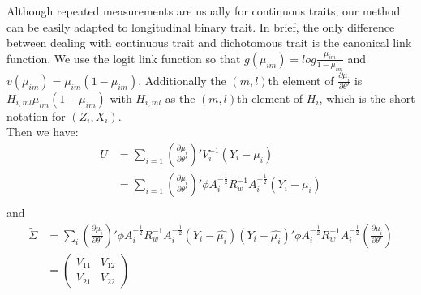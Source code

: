 \documentclass[12pt]{article}
\begin{document}

Although repeated measurements are usually for continuous traits, our method can be easily adapted to longitudinal binary trait. In brief, the only difference between dealing with continuous trait and dichotomous trait is the canonical link function.
We use the logit link function so that $g(\mu_{im}) = log \frac{\mu_{im}}{1 - \mu_{im}}$ and $v(\mu_{im}) = \mu_{im} (1 - \mu_{im})$. Additionally the $(m, l)$th element of $\frac{\partial\mu_{i}}{\partial\theta'}$ is
$
H_{i,ml} \mu_{im} (1- \mu_{im})
$
with $H_{i,ml}$ as the $(m, l)$th element of $H_i$, which is the short notation for $(Z_{i},X_{i})$.\\
Then we have:
\begin{align*}
U & = \sum_{i=1} (\frac{\partial\mu_{i}}{\partial\theta'})' V_i^{-1} (Y_{i}-\mu_{i})\\
& = \sum_{i=1} (\frac{\partial\mu_{i}}{\partial\theta'})' \phi A_{i}^{-\frac{1}{2}} R_{w}^{-1} A_{i}^{-\frac{1}{2}} (Y_{i}-\mu_{i})\\
\end{align*}
and
\begin{align*}
\widetilde{\Sigma} & = \sum_{i}\left(\frac{\partial\mu_{i}}{\partial\theta'}\right)' \phi A_{i}^{-\frac{1}{2}} R_{w}^{-1} A_{i}^{-\frac{1}{2}} (Y_{i}-\hat{\mu_{i}}) (Y_{i}-\hat{\mu_{i}})' \phi A_{i}^{-\frac{1}{2}} R_{w}^{-1} A_{i}^{-\frac{1}{2}} \left( \frac{\partial\mu_{i}}{\partial\theta'} \right)\\
& = 
\begin{pmatrix}
V_{11} & V_{12}\\
 V_{21} & V_{22}
\end{pmatrix}
\end{align*}
\end{document}
